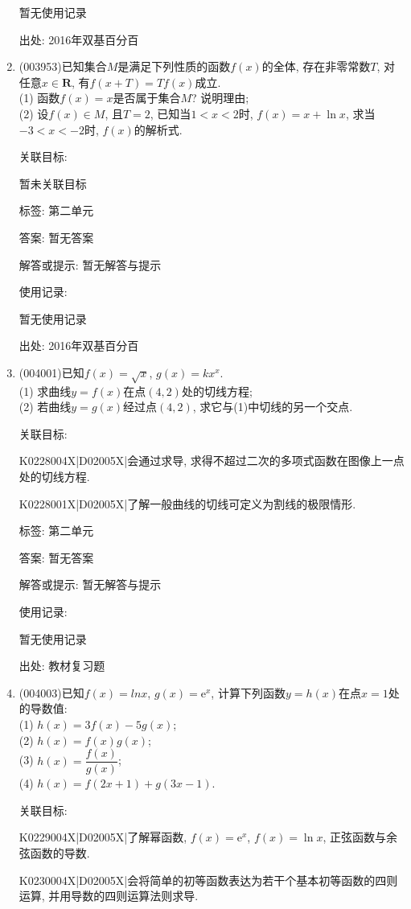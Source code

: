 \documentclass[10pt,a4paper]{article}
\begin{document}
\begin{enumerate}[1.]
暂无使用记录


出处: 2016年双基百分百
\item { (003953)}已知集合$M$是满足下列性质的函数$f(x)$的全体, 存在非零常数$T$, 对任意$x\in \mathbf{R}$, 有$f(x+T)=Tf(x)$成立.\\
(1) 函数$f(x)=x$是否属于集合$M$? 说明理由;\\
(2) 设$f(x)\in M$, 且$T=2$, 已知当$1<x<2$时, $f(x)=x+\ln x$, 求当$-3<x<-2$时, $f(x)$的解析式.


关联目标:

暂未关联目标



标签: 第二单元

答案: 暂无答案

解答或提示: 暂无解答与提示

使用记录:

暂无使用记录


出处: 2016年双基百分百
\item { (004001)}已知$f(x)=\sqrt{x}$, $g(x)=kx^x$.\\
(1) 求曲线$y=f(x)$在点$(4,2)$处的切线方程;\\
(2) 若曲线$y=g(x)$经过点$(4,2)$, 求它与(1)中切线的另一个交点.


关联目标:

K0228004X|D02005X|会通过求导, 求得不超过二次的多项式函数在图像上一点处的切线方程.

K0228001X|D02005X|了解一般曲线的切线可定义为割线的极限情形.



标签: 第二单元

答案: 暂无答案

解答或提示: 暂无解答与提示

使用记录:

暂无使用记录


出处: 教材复习题
\item { (004003)}已知$f(x)=lnx$, $g(x)=\mathrm{e}^x$, 计算下列函数$y=h(x)$在点$x=1$处的导数值:\\
(1) $h(x)=3f(x)-5g(x)$;\\
(2) $h(x)=f(x)g(x)$;\\
(3) $h(x)=\dfrac{f(x)}{g(x)}$;\\
(4) $h(x)=f(2x+1)+g(3x-1)$.


关联目标:

K0229004X|D02005X|了解幂函数, $f(x)=\mathrm{e}^x$, $f(x)=\ln x$, 正弦函数与余弦函数的导数.

K0230004X|D02005X|会将简单的初等函数表达为若干个基本初等函数的四则运算, 并用导数的四则运算法则求导.


\end{enumerate}
\end{document}
